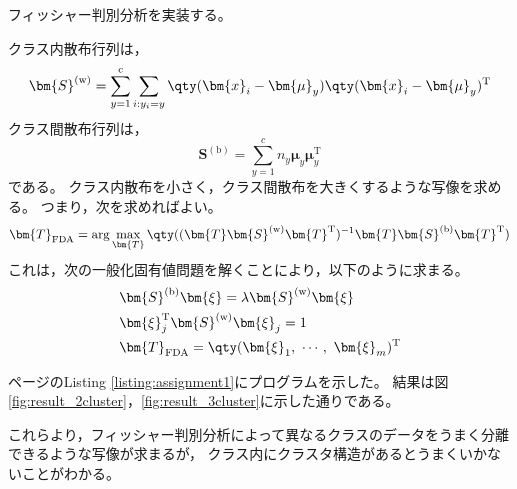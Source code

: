 \documentclass[class=jsarticle, crop=false, dvipdfmx, fleqn]{standalone}
\begin{document}
\section{}


フィッシャー判別分析を実装する。

クラス内散布行列は，
\begin{equation}
    \bm{S}^\mathrm{(w)} = \sum_{y=1}^{c} \sum_{i: y_i=y} \qty(\bm{x}_i - \bm{\mu}_y) \qty(\bm{x}_i - \bm{\mu}_y)^\mathrm{T}
    \label{eq:within_class_scattering_matrix}
\end{equation}
クラス間散布行列は，
\begin{equation}
    \bm{S}^\mathrm{(b)} = \sum_{y=1}^{c} n_y \bm{\mu}_y \bm{\mu}_y^\mathrm{T}
    \label{eq:between_class_scattering_matrix}
\end{equation}
である。
クラス内散布を小さく，クラス間散布を大きくするような写像を求める。
つまり，次を求めればよい。
\begin{equation}
    \bm{T}_\mathrm{FDA} = \arg\max_{\bm{T}} \qty((\bm{T}\bm{S}^\mathrm{(w)} \bm{T}^\mathrm{T})^{-1} \bm{T}\bm{S}^\mathrm{(b)} \bm{T}^\mathrm{T})
\end{equation}
これは，次の一般化固有値問題を解くことにより，以下のように求まる。
\begin{align}
    & \bm{S}^\mathrm{(b)} \bm{\xi} = \lambda \bm{S}^\mathrm{(w)} \bm{\xi} \\
    & \bm{\xi}_j^\mathrm{T} \bm{S}^\mathrm{(w)} \bm{\xi}_j = 1 \\
    & \bm{T}_\mathrm{FDA} = \qty(\bm{\xi}_1,\ \cdots,\ \bm{\xi}_m)^\mathrm{T}
\end{align}



\pageref{listing:assignment1}ページのListing \ref{listing:assignment1}にプログラムを示した。
結果は図\ref{fig:result_2cluster}，\ref{fig:result_3cluster}に示した通りである。

これらより，フィッシャー判別分析によって異なるクラスのデータをうまく分離できるような写像が求まるが，
クラス内にクラスタ構造があるとうまくいかないことがわかる。
\end{document}
